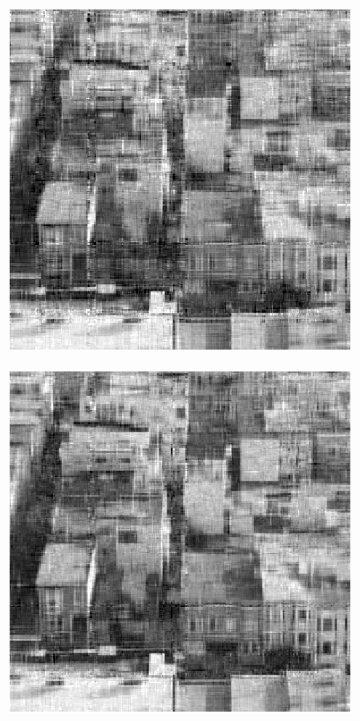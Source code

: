 \begin{figure}
    \begin{subfigure}{0.325\linewidth}
        \includegraphics[width=\linewidth]{Poglavja/Slike/kompleksnost/kompleksna grayscale 300/rez35LMaFit.png}
    \end{subfigure}
    \hfill
    \begin{subfigure}{0.325\linewidth}
        \includegraphics[width=\linewidth]{Poglavja/Slike/kompleksnost/kompleksna grayscale 300/rez45LMaFit.png}

\end{subfigure}
\end{figure}

